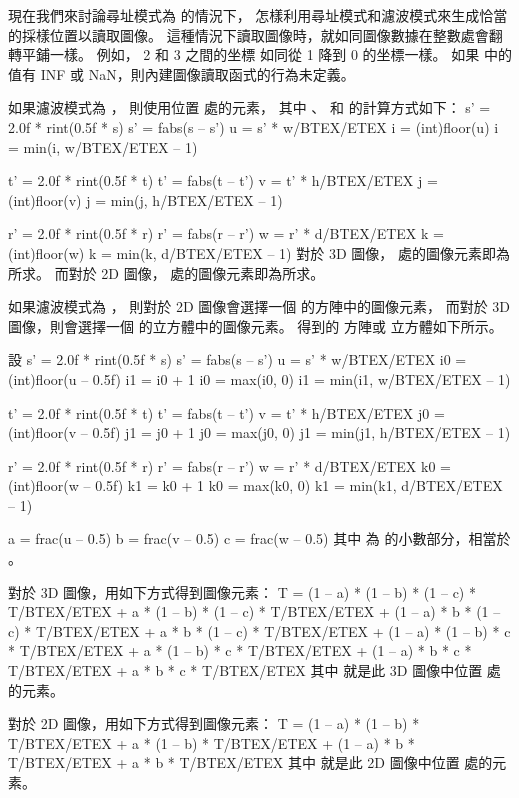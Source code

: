 現在我們來討論尋址模式為  的情況下，
怎樣利用尋址模式和濾波模式來生成恰當的採樣位置以讀取圖像。
這種情況下讀取圖像時，就如同圖像數據在整數處會翻轉平鋪一樣。
例如， 2 和 3 之間的坐標  如同從 1 降到 0 的坐標一樣。
如果  中的值有 INF 或 NaN，則內建圖像讀取函式的行為未定義。

{}

如果濾波模式為 ，
則使用位置  處的元素，
其中 、  和  的計算方式如下：
\startclc[indentnext=no]
s’ = 2.0f * rint(0.5f * s)
s’ = fabs(s – s’)
u = s’ * w/BTEX/ETEX
i = (int)floor(u)
i = min(i, w/BTEX/ETEX – 1)

t’ = 2.0f * rint(0.5f * t)
t’ = fabs(t – t’)
v = t’ * h/BTEX/ETEX
j = (int)floor(v)
j = min(j, h/BTEX/ETEX – 1)

r’ = 2.0f * rint(0.5f * r)
r’ = fabs(r – r’)
w = r’ * d/BTEX/ETEX
k = (int)floor(w)
k = min(k, d/BTEX/ETEX – 1)
\stopclc
對於 3D 圖像，  處的圖像元素即為所求。
而對於 2D 圖像，  處的圖像元素即為所求。

{}

如果濾波模式為 ，
則對於 2D 圖像會選擇一個  的方陣中的圖像元素，
而對於 3D 圖像，則會選擇一個  的立方體中的圖像元素。
得到的  方陣或  立方體如下所示。

設
\startclc[indentnext=no]
s’ = 2.0f * rint(0.5f * s)
s’ = fabs(s – s’)
u = s’ * w/BTEX/ETEX
i0 = (int)floor(u – 0.5f)
i1 = i0 + 1
i0 = max(i0, 0)
i1 = min(i1, w/BTEX/ETEX – 1)

t’ = 2.0f * rint(0.5f * t)
t’ = fabs(t – t’)
v = t’ * h/BTEX/ETEX
j0 = (int)floor(v – 0.5f)
j1 = j0 + 1
j0 = max(j0, 0)
j1 = min(j1, h/BTEX/ETEX – 1)

r’ = 2.0f * rint(0.5f * r)
r’ = fabs(r – r’)
w = r’ * d/BTEX/ETEX
k0 = (int)floor(w – 0.5f)
k1 = k0 + 1
k0 = max(k0, 0)
k1 = min(k1, d/BTEX/ETEX – 1)

a = frac(u – 0.5)
b = frac(v – 0.5)
c = frac(w – 0.5)
\stopclc
其中  為  的小數部分，相當於 。

對於 3D 圖像，用如下方式得到圖像元素：
\startclc[indentnext=no]
T = (1 – a) * (1 – b) * (1 – c) * T/BTEX/ETEX
    + a * (1 – b) * (1 – c) * T/BTEX/ETEX
    + (1 – a) * b * (1 – c) * T/BTEX/ETEX
    + a * b * (1 – c) * T/BTEX/ETEX
    + (1 – a) * (1 – b) * c * T/BTEX/ETEX
    + a * (1 – b) * c * T/BTEX/ETEX
    + (1 – a) * b * c * T/BTEX/ETEX
    + a * b * c * T/BTEX/ETEX
\stopclc
其中  就是此 3D 圖像中位置  處的元素。

對於 2D 圖像，用如下方式得到圖像元素：
\startclc[indentnext=no]
T = (1 – a) * (1 – b) * T/BTEX/ETEX
    + a * (1 – b) * T/BTEX/ETEX
    + (1 – a) * b * T/BTEX/ETEX
    + a * b * T/BTEX/ETEX
\stopclc
其中  就是此 2D 圖像中位置  處的元素。
